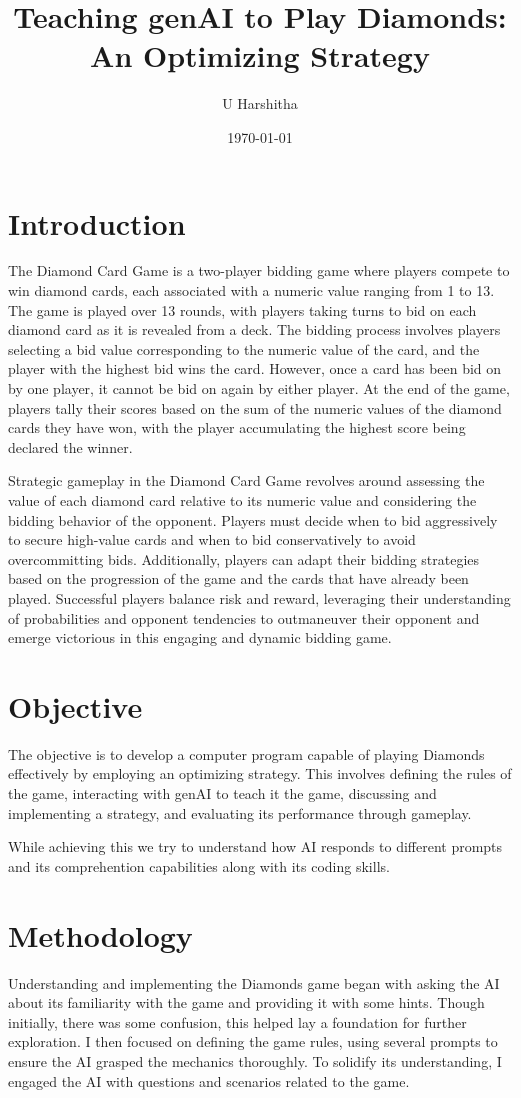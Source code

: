 \documentclass{article}
\title{Teaching genAI to Play Diamonds: An Optimizing Strategy}
\author{U Harshitha}
\date{\today}
\begin{document}
\maketitle

\section{Introduction}
The Diamond Card Game is a two-player bidding game where players compete to win diamond cards, each associated with a numeric value ranging from 1 to 13. The game is played over 13 rounds, with players taking turns to bid on each diamond card as it is revealed from a deck. The bidding process involves players selecting a bid value corresponding to the numeric value of the card, and the player with the highest bid wins the card. However, once a card has been bid on by one player, it cannot be bid on again by either player. At the end of the game, players tally their scores based on the sum of the numeric values of the diamond cards they have won, with the player accumulating the highest score being declared the winner.

Strategic gameplay in the Diamond Card Game revolves around assessing the value of each diamond card relative to its numeric value and considering the bidding behavior of the opponent. Players must decide when to bid aggressively to secure high-value cards and when to bid conservatively to avoid overcommitting bids. Additionally, players can adapt their bidding strategies based on the progression of the game and the cards that have already been played. Successful players balance risk and reward, leveraging their understanding of probabilities and opponent tendencies to outmaneuver their opponent and emerge victorious in this engaging and dynamic bidding game.
\section{Objective}
The objective is to develop a computer program capable of playing Diamonds effectively by employing an optimizing strategy. This involves defining the rules of the game, interacting with genAI to teach it the game, discussing and implementing a strategy, and evaluating its performance through gameplay.

While achieving this we try to understand how AI responds to different prompts and its comprehention capabilities along with its coding skills.  
\section{Methodology}
Understanding and implementing the Diamonds game began with asking the AI about its familiarity with the game and providing it with some hints. Though initially, there was some confusion, this helped lay a foundation for further exploration. I then focused on defining the game rules, using several prompts to ensure the AI grasped the mechanics thoroughly. To solidify its understanding, I engaged the AI with questions and scenarios related to the game.
\end{document}
